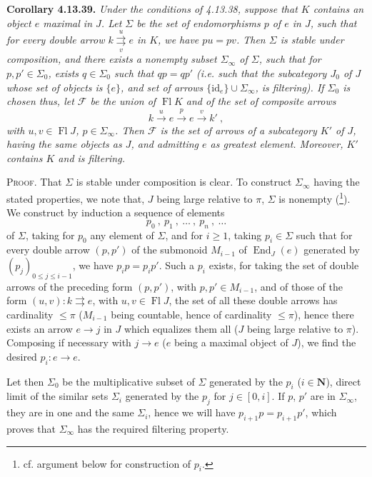 \documentclass[11pt]{article}
\newcommand{\printedpage}[1]{\marginpar{\footnotesize p.~#1}}
\newcommand{\msp}[1]{\marginpar{\footnotesize [#1]}}
\newcommand{\Fl}{\operatorname{Fl}}
\newcommand{\End}{\operatorname{End}}
\newcommand{\id}{\mathrm{id}}
\begin{document}
\printedpage{139}

\noindent\textbf{Corollary 4.13.39.} {\itshape Under the conditions of 4.13.38, suppose that $K$ contains an object $e$ maximal in $J$. Let $\Sigma$ be the set of endomorphisms $p$ of $e$ in $J$, such that for every double arrow $k \overset{u}{\underset{v}{\rightrightarrows}} e$ \textup{in} $K$, we have $pu=pv$. Then $\Sigma$ is stable under composition, and there exists a nonempty subset $\Sigma_\infty$ of $\Sigma$, such that for $p,p'\in\Sigma_0$, exists
\msp{page 367}
$q\in\Sigma_0$ such that $qp=qp'$ (i.e. such that the subcategory $J_0$ of $J$ whose set of objects is $\{e\}$, and set of arrows $\{\id_e\}\cup\Sigma_\infty$, is filtering). If $\Sigma_0$ is chosen thus, let $\mathcal{F}$ be the union of $\Fl K$ and of the set of composite arrows
\[
k \xrightarrow{\ u\ } e \xrightarrow{\ p\ } e \xrightarrow{\ v\ } k'\ , \tag*{$(*)$}
\]
with $u,v\in\Fl J$, $p\in\Sigma_\infty$. Then $\mathcal{F}$ is the set of arrows of a subcategory $K'$ of $J$, having the same objects as $J$, and admitting $e$ as greatest element. Moreover, $K'$ contains $K$ and is filtering.}

\noindent\textsc{Proof}. That $\Sigma$ is stable under composition is clear. To construct $\Sigma_\infty$ having the stated properties, we note that, $J$ being large relative to $\pi$, $\Sigma$ is nonempty (\footnote[162]{cf. argument below for construction of $p_i$.}). We construct by induction a sequence of elements
\[
p_0\ ,\ p_1\ ,\ \ldots\ ,\ p_n\ ,\ \ldots
\]
of $\Sigma$, taking for $p_0$ any element of $\Sigma$, and for $i\geqslant 1$, taking $p_i\in\Sigma$ such that for every double arrow $(p,p')$ of the submonoid $M_{i-1}$ of $\End_J(e)$ generated by $(p_j)_{0\leqslant j\leqslant i-1}$, we have $p_ip=p_ip'$. Such a $p_i$ exists, for taking the set of double arrows of the preceding form $(p,p')$, with $p,p'\in M_{i-1}$, and of those of the form $(u,v) : k \rightrightarrows e$, with $u,v\in\Fl J$, the set of
\msp{page 368}
all these double arrows has cardinality $\leqslant\pi$ ($M_{i-1}$ being countable, hence of cardinality $\leqslant\pi$), hence there exists an arrow $e\longrightarrow j$ in $J$ which equalizes them all ($J$ being large relative to $\pi$). Composing if necessary with $j\longrightarrow e$ ($e$ being a maximal object of $J$), we find the desired $p_i : e\longrightarrow e$.

Let then $\Sigma_0$ be the multiplicative subset of $\Sigma$ generated by the $p_i$ ($i\in\mathbf{N}$), direct limit of the similar sets $\Sigma_i$ generated by the $p_j$ for $j\in[0,i]$. If $p$, $p'$ are in $\Sigma_\infty$, they are in one and the same $\Sigma_i$, hence we will have $p_{i+1}p=p_{i+1}p'$, which proves that $\Sigma_\infty$ has the required filtering property. %
\end{document}
